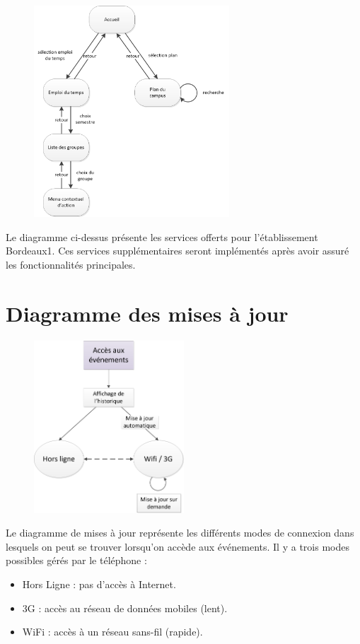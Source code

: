 \begin{figure}[h]
	\center
	\includegraphics[width=0.65\textwidth]{resources/features2.png}
\end{figure}

Le diagramme ci-dessus présente les services offerts pour l'établissement Bordeaux1. Ces services supplémentaires seront implémentés après avoir assuré les fonctionnalités principales.

\newpage
\section{Diagramme des mises à jour}

\begin{figure}[h]
  \center
  \includegraphics[width=0.5\textwidth]{resources/state_diagram.png}
\end{figure}

Le diagramme de mises à jour représente les différents modes de connexion dans lesquels on peut se trouver lorsqu'on accède aux événements. Il y a trois modes possibles gérés par le téléphone :\\
\begin{itemize}
\renewcommand{\labelitemi}{$\bullet$}
 \item Hors Ligne : pas d'accès à Internet.
 \item 3G :  accès au réseau de données mobiles (lent).
 \item WiFi : accès à un réseau sans-fil (rapide).
\end{itemize}

